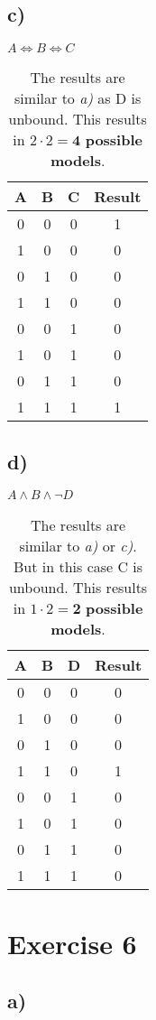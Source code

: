 \documentclass[11pt]{article}
\begin{document}
\newpage

\subsection*{c)} 
$A \Leftrightarrow  B \Leftrightarrow  C$
\begin{table}[h]
  \begin{tabular}{c|c|c||c}
    A & B & C & Result\\
    \hline
    0 & 0 & 0 & 1 \\
    1 & 0 & 0 & 0 \\
    0 & 1 & 0 & 0 \\
    1 & 1 & 0 & 0 \\
    0 & 0 & 1 & 0 \\
    1 & 0 & 1 & 0 \\
    0 & 1 & 1 & 0 \\
    1 & 1 & 1 & 1
  \end{tabular}
  \caption*{The results are similar to \textit{a)} as D is unbound. This results in $2 \cdot 2 = \textbf{4}$ \textbf{possible models}.}
\end{table}

\subsection*{d)} 
$A \wedge  B \wedge \neg D$
\begin{table}[h]
  \begin{tabular}{c|c|c||c}
    A & B & D & Result\\
    \hline
    0 & 0 & 0 & 0 \\
    1 & 0 & 0 & 0 \\
    0 & 1 & 0 & 0 \\
    1 & 1 & 0 & 1 \\
    0 & 0 & 1 & 0 \\
    1 & 0 & 1 & 0 \\
    0 & 1 & 1 & 0 \\
    1 & 1 & 1 & 0
  \end{tabular}
  \caption*{The results are similar to \textit{a)} or \textit{c)}. But in this case C is unbound. This results in $1 \cdot 2 = \textbf{2}$ \textbf{possible models}.}
\end{table}

\newpage
\section*{Exercise 6}
\subsection*{a)}
\end{document}
